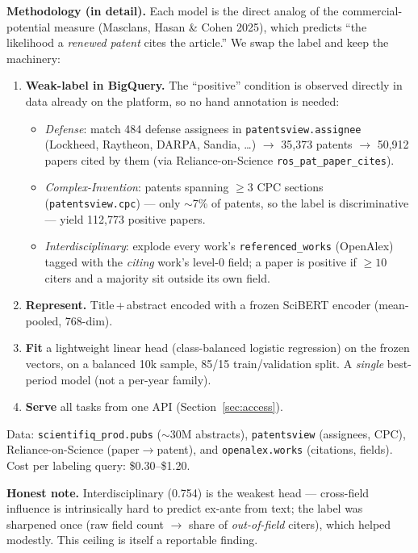 \documentclass[11pt]{article}
\begin{document}
\textbf{Methodology (in detail).} Each model is the direct analog of the
commercial-potential measure (Masclans, Hasan \& Cohen 2025), which predicts ``the
likelihood a \emph{renewed patent} cites the article.'' We swap the label and keep
the machinery:
\begin{enumerate}[leftmargin=1.5em, itemsep=2pt]
  \item \textbf{Weak-label in BigQuery.} The ``positive'' condition is observed
  directly in data already on the platform, so no hand annotation is needed:
  \begin{itemize}[leftmargin=1.2em, itemsep=1pt]
    \item \emph{Defense}: match 484 defense assignees in \texttt{patentsview.assignee}
    (Lockheed, Raytheon, DARPA, Sandia, \dots) $\rightarrow$ 35{,}373 patents
    $\rightarrow$ 50{,}912 papers cited by them (via Reliance-on-Science
    \texttt{ros\_pat\_paper\_cites}).
    \item \emph{Complex-Invention}: patents spanning $\geq 3$ CPC sections
    (\texttt{patentsview.cpc}) --- only $\sim$7\% of patents, so the label is
    discriminative --- yield 112{,}773 positive papers.
    \item \emph{Interdisciplinary}: explode every work's \texttt{referenced\_works}
    (OpenAlex) tagged with the \emph{citing} work's level-0 field; a paper is
    positive if $\geq 10$ citers and a majority sit outside its own field.
  \end{itemize}
  \item \textbf{Represent.} Title\,+\,abstract encoded with a frozen SciBERT
  encoder (mean-pooled, 768-dim).
  \item \textbf{Fit} a lightweight linear head (class-balanced logistic regression)
  on the frozen vectors, on a balanced 10k sample, 85/15 train/validation split.
  A \emph{single} best-period model (not a per-year family).
  \item \textbf{Serve} all tasks from one API (Section~\ref{sec:access}).
\end{enumerate}
Data: \texttt{scientifiq\_prod.pubs} ($\sim$30M abstracts), \texttt{patentsview}
(assignees, CPC), Reliance-on-Science (paper$\rightarrow$patent), and
\texttt{openalex.works} (citations, fields). Cost per labeling query: \$0.30--\$1.20.

\textbf{Honest note.} Interdisciplinary (0.754) is the weakest head --- cross-field
influence is intrinsically hard to predict ex-ante from text; the label was
sharpened once (raw field count $\rightarrow$ share of \emph{out-of-field} citers),
which helped modestly. This ceiling is itself a reportable finding.
\end{document}
